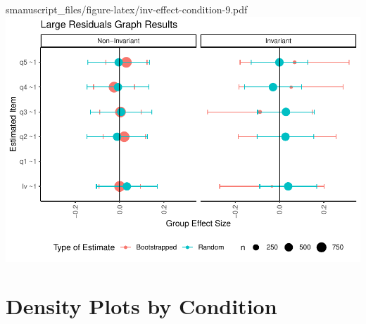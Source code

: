 \documentclass[
  man]{apa7}
\begin{document}
s{manuscript_files/figure-latex/inv-effect-condition-9.pdf} \includegraphics{manuscript_files/figure-latex/inv-effect-condition-10.pdf}

\hypertarget{density-plots-by-condition}{%
\section{Density Plots by Condition}\label{density-plots-by-condition}}
\end{document}

